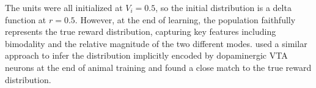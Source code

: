 \begin{figure*}[!t]
{        The units were all initialized at $V_i = 0.5$, so the initial distribution is a delta function at $r = 0.5$.
        However, at the end of learning, the population faithfully represents the true reward distribution, capturing key features including bimodality and the relative magnitude of the two different modes.
        \citet{dabney2020distributional} used a similar approach to infer the distribution implicitly encoded by dopaminergic VTA neurons at the end of animal training and found a close match to the true reward distribution.
        }
    \vspace*{-1.0em}
\end{figure*}


